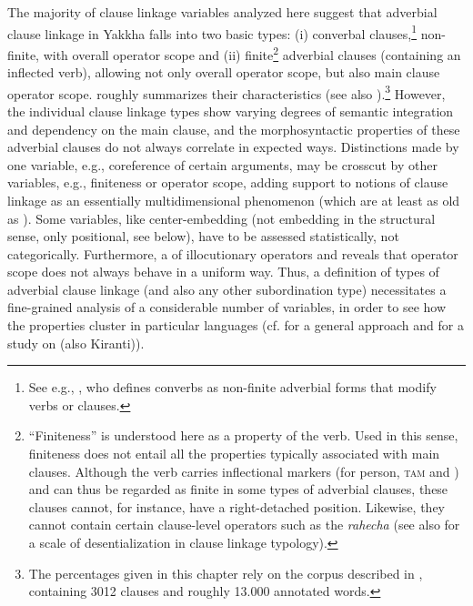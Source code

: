 The majority of clause linkage variables analyzed here  suggest that adverbial clause linkage in Yakkha falls into two basic types: (i) converbal clauses,\footnote{See e.g., \citet{Haspelmath1995The-converb}, who defines converbs as non-finite adverbial forms that modify verbs or clauses.} non-finite, with overall operator scope and (ii) finite\footnote{“Finiteness” is understood here as a property of the verb. Used in this sense, finiteness does not entail all the properties typically associated with main clauses.  Although the verb carries inflectional markers (for person, \textsc{tam} and ) and can thus be regarded as finite in some types of adverbial clauses, these clauses cannot, for instance, have a right-detached position. Likewise,  they cannot contain certain clause-level operators such as the  \emph{rahecha} (see also \citet[220]{Lehmann1988Towards} for a scale of desentialization in  clause linkage typology).}  adverbial clauses (containing an inflected verb), allowing not only overall operator scope, but also main clause operator scope.  roughly summarizes their  characteristics (see also \citealt{Bierkandtetal_Scope}).\footnote{The percentages given in this chapter rely on the corpus described in , containing 3012 clauses and roughly 13.000 annotated words.} However, the individual clause linkage types show varying degrees of semantic integration and dependency on the main clause, and the morphosyntactic properties of these adverbial clauses do not always correlate in expected ways. Distinctions made by one variable, e.g., coreference of certain arguments, may be crosscut by other variables, e.g., finiteness or operator scope, adding support to notions of clause linkage as an essentially multidimensional phenomenon (which are at least as old as \citealt{HaimanThompson1984_Subordination}). Some variables, like center-embedding (not embedding in the structural sense, only positional, see below), have to be assessed statistically, not categorically. Furthermore, a  of illocutionary operators and  reveals that operator scope does not always behave in a uniform way. Thus, a definition of types of adverbial clause linkage (and also any other subordination type) necessitates a fine-grained ana\-lysis of a considerable number of variables, in order to see how the properties cluster in particular languages (cf. \citet{Bickel2010_Capturing} for a general approach and \citet{Schackowetal2012_Morphosyntactic} for a  study on  (also Kiranti)). 



